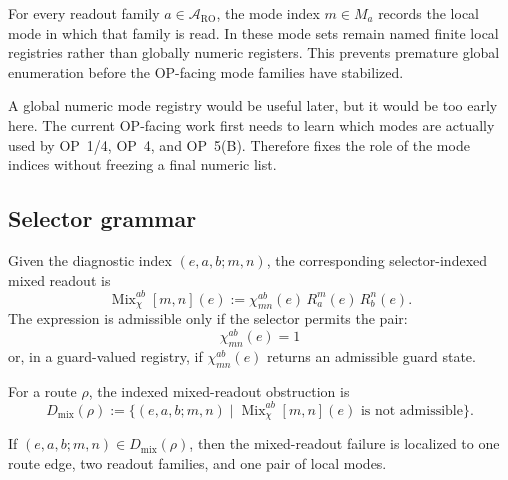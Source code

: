 \begin{definition}
\label{def:v410r19-mode-index-registry}
For every readout family \(a\in\mathcal A_{\mathrm{RO}}\), the mode index
\(m\in M_a\) records the local mode in which that family is read. In these
mode sets remain named finite local registries rather than globally numeric
registers. This prevents premature global enumeration before the OP-facing
mode families have stabilized.
\end{definition}

\begin{remark}
\label{rem:v410r19-why-modes-not-global-numbered}
A global numeric mode registry would be useful later, but it would be too early
here. The current OP-facing work first needs to learn which modes are actually
used by OP~1/4, OP~4, and OP~5(B). Therefore fixes the role of the mode
indices without freezing a final numeric list.
\end{remark}

\subsection{Selector grammar}
\label{subsec:v410r19-selector-grammar}

\begin{definition}
\label{def:v410r19-selector-indexed-mixed-readout}
Given the diagnostic index \((e,a,b;m,n)\), the corresponding selector-indexed
mixed readout is
\[
 \operatorname{Mix}_{\chi}^{ab}[m,n](e)
 :=
 \chi^{ab}_{mn}(e)\,
 R_a^m(e)\,
 R_b^n(e).
\]
The expression is admissible only if the selector permits the pair:
\[
 \chi^{ab}_{mn}(e)=1
\]
or, in a guard-valued registry, if \(\chi^{ab}_{mn}(e)\) returns an admissible
guard state.
\end{definition}

\begin{definition}
\label{def:v410r19-mixed-readout-obstruction-with-indices}
For a route \(\rho\), the indexed mixed-readout obstruction is
\[
 D_{\mathrm{mix}}(\rho)
 :=
 \{(e,a,b;m,n)\mid
 \operatorname{Mix}_{\chi}^{ab}[m,n](e)
 \text{ is not admissible}\}.
\]
\end{definition}

\begin{proposition}
\label{prop:v410r19-indexed-failure-localization}
If \((e,a,b;m,n)\in D_{\mathrm{mix}}(\rho)\), then the mixed-readout failure is
localized to one route edge, two readout families, and one pair of local modes.
\end{proposition}

